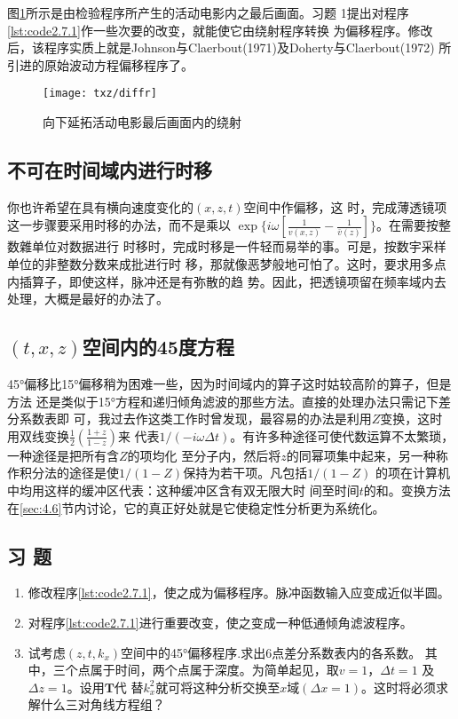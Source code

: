 图\ref{fig:txz/diffr}所示是由检验程序所产生的活动电影内之最后画面。习题
1提出对程序\ref{lst:code2.7.1}作一些次要的改变，就能使它由绕射程序转换
为偏移程序。修改后，该程序实质上就是Johnson与Claerbout(1971)及Doherty与Claerbout(1972)
所引进的原始波动方程偏移程序了。
\begin{figure}[H]
\centering
\texttt{[image: txz/diffr]}
\caption[diffr]{向下延拓活动电影最后画面内的绕射}
\label{fig:txz/diffr}
\end{figure}

\subsection{不可在时间域内进行时移}
\label{sec:2.7.3}

你也许希望在具有横向速度变化的$(x,z,t)$空间中作偏移，这
时，完成薄透镜项这一步骤要采用时移的办法，而不是乘以
$\exp\{i\omega[\frac{1}{v(x,z)}-\frac{1}{\bar{v}(z)}]\}$。在需要按整数雜单位对数据进行
时移时，完成时移是一件轻而易举的事。可是，按数宇采样单位的非整数分数来成批进行时
移，那就像恶梦般地可怕了。这时，要求用多点内插算子，即使这样，脉冲还是有弥散的趋
势。因此，把透镜项留在频率域内去处理，大概是最好的办法了。

\subsection{$(t,x,z)$空间内的45度方程}
\label{sec:2.7.4}

45°偏移比15°偏移稍为困难一些，因为时间域内的算子这时姑较高阶的算子，但是方法
还是类似于15°方程和递归倾角滤波的那些方法。直接的处理办法只需记下差分系数表即
可，我过去作这类工作时曾发现，最容易的办法是利用$Z$变换，这时用双线变换$\frac{1}{2}(\frac{1+z}{1-z})$来
代表$1/(-i\omega\Delta t)$。有许多种途径可使代数运算不太繁琐，一种途径是把所有含$Z$的项均化
至分子内，然后将$z$的同幂项集中起来，另一种称作积分法的途径是使$1/(1-Z)$保持为若干项。凡包括$1/(1-Z)$
的项在计算机中均用这样的缓冲区代表：这种缓冲区含有双无限大时
间至时间$t$的和。变换方法在\ref{sec:4.6}节内讨论，它的真正好处就是它使稳定性分析更为系统化。

\subsection{习 题}
\label{sec:2.7.5}

\begin{enumerate}
\item 修改程序\ref{lst:code2.7.1}，使之成为偏移程序。脉冲函数输入应变成近似半圆。
\item 对程序\ref{lst:code2.7.1}进行重要改变，使之变成一种低通倾角滤波程序。
\item 试考虑$(z,t,k_x)$空间中的45°偏移程序.求出6点差分系数表内的各系数。
  其中，三个点属于时间，两个点属于深度。为简单起见，取$v=1$，$\Delta t=1$
  及$\Delta z=1$。设用$\mathbf{T}$代
  替$k_x^2$就可将这种分析交换至$x$域$(\Delta x=1)$。这时将必须求解什么三对角线方程组？
\end{enumerate}

